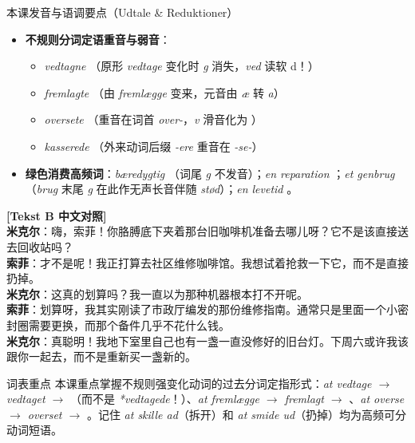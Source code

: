 \begin{tipbox}{本课发音与语调要点（Udtale \& Reduktioner）}
\begin{itemize}
  \item \textbf{不规则分词定语重音与弱音}：
    \begin{itemize}
      \item \textit{vedtagne} （原形 \textit{vedtage} 变化时 \textit{g} 消失，\textit{ved} 读软 d！）
      \item \textit{fremlagte} （由 \textit{fremlægge} 变来，元音由 \textit{æ} 转 \textit{a}）
      \item \textit{oversete} （重音在词首 \textit{over-}，\textit{v} 滑音化为 ）
      \item \textit{kasserede} （外来动词后缀 \textit{-ere} 重音在 \textit{-se-}）
    \end{itemize}
  \item \textbf{绿色消费高频词}：\textit{bæredygtig} （词尾 \textit{g} 不发音）；\textit{en reparation} ；\textit{et genbrug} （\textit{brug} 末尾 \textit{g} 在此作无声长音伴随 \textit{stød}）；\textit{en levetid} 。
\end{itemize}
\end{tipbox}

\begin{transbox}
\small
\textbf{\color{NCDTeal}[Tekst B 中文对照]}\\
\textbf{米克尔}：嗨，索菲！你胳膊底下夹着那台旧咖啡机准备去哪儿呀？它不是该直接送去回收站吗？\\
\textbf{索菲}：才不是呢！我正打算去社区维修咖啡馆。我想试着抢救一下它，而不是直接扔掉。\\
\textbf{米克尔}：这真的划算吗？我一直以为那种机器根本打不开呢。\\
\textbf{索菲}：划算呀，我其实刚读了市政厅编发的那份维修指南。通常只是里面一个小密封圈需要更换，而那个备件几乎不花什么钱。\\
\textbf{米克尔}：真聪明！我地下室里自己也有一盏一直没修好的旧台灯。下周六或许我该跟你一起去，而不是重新买一盏新的。
\end{transbox}


\begin{tipbox}{词表重点}
本课重点掌握不规则强变化动词的过去分词定指形式：\textit{at vedtage $\rightarrow$ vedtaget $\rightarrow$ }（而不是 \textit{*vedtagede}！）、\textit{at fremlægge $\rightarrow$ fremlagt $\rightarrow$ }、\textit{at overse $\rightarrow$ overset $\rightarrow$ }。记住 \textit{at skille ad}（拆开）和 \textit{at smide ud}（扔掉）均为高频可分动词短语。
\end{tipbox}

